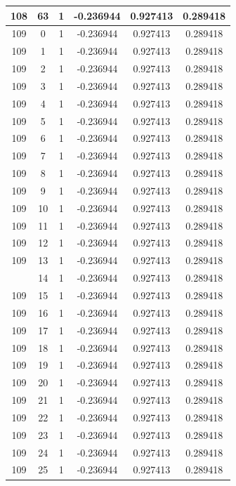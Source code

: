 \documentclass[12pt,a4paper]{article}
\numberwithin{equation}{section}
\numberwithin{figure}{section}
\numberwithin{table}{section}
\begin{document}
\begin{longtable}{|c|c|c|c|c|c|}
108 & 63 & 1 & -0.236944 & 0.927413 & 0.289418 \\ \hline
109 & 0 & 1 & -0.236944 & 0.927413 & 0.289418 \\ \hline
109 & 1 & 1 & -0.236944 & 0.927413 & 0.289418 \\ \hline
109 & 2 & 1 & -0.236944 & 0.927413 & 0.289418 \\ \hline
109 & 3 & 1 & -0.236944 & 0.927413 & 0.289418 \\ \hline
109 & 4 & 1 & -0.236944 & 0.927413 & 0.289418 \\ \hline
109 & 5 & 1 & -0.236944 & 0.927413 & 0.289418 \\ \hline
109 & 6 & 1 & -0.236944 & 0.927413 & 0.289418 \\ \hline
109 & 7 & 1 & -0.236944 & 0.927413 & 0.289418 \\ \hline
109 & 8 & 1 & -0.236944 & 0.927413 & 0.289418 \\ \hline
109 & 9 & 1 & -0.236944 & 0.927413 & 0.289418 \\ \hline
109 & 10 & 1 & -0.236944 & 0.927413 & 0.289418 \\ \hline
109 & 11 & 1 & -0.236944 & 0.927413 & 0.289418 \\ \hline
109 & 12 & 1 & -0.236944 & 0.927413 & 0.289418 \\ \hline
109 & 13 & 1 & -0.236944 & 0.927413 & 0.289418 \\ \hline
\pagebreak
109 & 14 & 1 & -0.236944 & 0.927413 & 0.289418 \\ \hline
109 & 15 & 1 & -0.236944 & 0.927413 & 0.289418 \\ \hline
109 & 16 & 1 & -0.236944 & 0.927413 & 0.289418 \\ \hline
109 & 17 & 1 & -0.236944 & 0.927413 & 0.289418 \\ \hline
109 & 18 & 1 & -0.236944 & 0.927413 & 0.289418 \\ \hline
109 & 19 & 1 & -0.236944 & 0.927413 & 0.289418 \\ \hline
109 & 20 & 1 & -0.236944 & 0.927413 & 0.289418 \\ \hline
109 & 21 & 1 & -0.236944 & 0.927413 & 0.289418 \\ \hline
109 & 22 & 1 & -0.236944 & 0.927413 & 0.289418 \\ \hline
109 & 23 & 1 & -0.236944 & 0.927413 & 0.289418 \\ \hline
109 & 24 & 1 & -0.236944 & 0.927413 & 0.289418 \\ \hline
109 & 25 & 1 & -0.236944 & 0.927413 & 0.289418 \\ \hline

\end{longtable}
\end{document}
